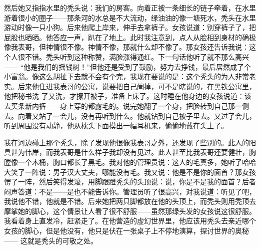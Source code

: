 然后她又指指水里的秃头说：我们的房客。向着正被一条细长的链子牵着，在水里游着很小的圈子——那条河的水总是不大流动，绿油油的像一塘死水，秃头在水里游动时像一只小狗。后来他爬上岸来，伸手去拿裤子。女孩说道：别穿裤子了，把屁股也晒晒。他答应一声，趴在了地上。此时我注意到，点人从脸相到身材的确极像我表哥，但神情很不像。神情不像，那就什么却不像了。那女孩还告诉我说：这个人很不错。秃头听到这种称赞，满脸涨得通红。下一句话他听了就不那么高兴—— “他是我们的摇钱树！”但他还是受到了鼓励，努力去挣钱，最后居然成了个小富翁。像这么胡扯下去就不会有个完，我现在要说的是：这个秃头的为人非常老实。后来他住进我表哥的公寓，说要把自己阉掉，可不是瞎说的，在黑铁公寓里，他把秘书洗 了又洗，才撩开被子，准备上床了。这时睡在他身边的女孩说道：该去买条新内裤——身上穿的都露毛的。说完她翻了一个身，把脸转到自己那一侧去。向着又站了一会儿，没有再听到什么。他就钻到自己被子里去。又过了会儿，听到周围没有动静，他从枕头下面摸出一幅耳机来，偷偷地戴在头上了。 



我在河边碰上那个秃头，除了发现他很像我表哥之外，还发现了些别的。此人的阳具甚为伟岸，而我表哥是什么样子我却没有见过。此人甚至比我表哥还要健壮，胸膛像一个木桶，胸口都长了黑毛。我对他的管理员说：这人的毛真多，她听了哈哈大笑了一阵说：男子汉大丈夫，哪能没有毛。我又说：他是不是你的面首？那女孩愣了一阵，然后笑得发滚，用脚跟蹬秃头的头顶说：说，你是不是我的面首？后者闷声答道：不是——是也不能告诉你。管理员听了很高兴，对我说道：听见了吧，我说他不错，他就是不错。后来她把两只脚都放在他的头顶上，而秃头则用秃顶去摩挲她的脚心，这个情景让人看了很不舒服——虽然那绿头发的女孩说这很舒服。我看着身上直发冷，赶紧走了。在他营造的虚幻世界里，他应该用秃头去亲近哪个女孩的脚心，但是他没有，他只是伏在一张桌子上不停地演算，探讨世界的奥秘—— 这就是秃头的可敬之处。
